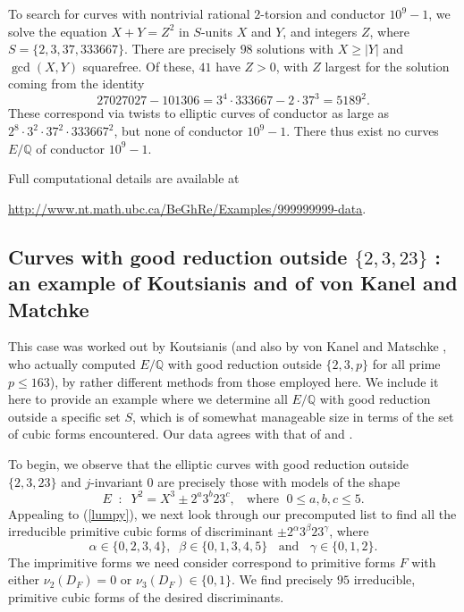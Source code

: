  To search for curves with nontrivial rational $2$-torsion and conductor $10^9-1$, we solve the equation $X+Y=Z^2$ in $S$-units $X$ and $Y$, and integers $Z$, where 
 $S=\{2,3, 37, 333667 \}$. There are precisely $98$ solutions with $X \geq |Y|$ and  $\gcd (X,Y)$ squarefree. Of these, $41$ have $Z > 0$, with $Z$ largest for the solution coming from  the identity
$$
27027027 -101306 = 3^4 \cdot 333667 -  2 \cdot 37^3 =  5189^2.
$$
These correspond via twists to elliptic curves of conductor as large as $2^8 \cdot 3^2 \cdot 37^2 \cdot 333667^2$, but none of conductor $10^9-1$. There thus exist no curves $E/\mathbb{Q}$  of conductor $10^9-1$.

Full computational details are available at
\begin{center}
\url{http://www.nt.math.ubc.ca/BeGhRe/Examples/999999999-data}.
\end{center}



\subsection{Curves with good reduction outside $\{ 2, 3, 23 \}$ : an example of Koutsianis and of von Kanel and Matchke}

This case was worked out by Koutsianis \cite{Kou} (and also by von Kanel and Matschke \cite{KanMat}, who actually computed $E/\mathbb{Q}$ with good reduction outside $\{ 2, 3, p \}$ for all prime $p \leq 163$), by rather different methods from those employed here. We include it here to provide an example where we determine all $E/\mathbb{Q}$ with good reduction outside a specific set $S$, which is of somewhat manageable size in terms of the set of cubic forms encountered. Our data agrees with that  of \cite{KanMat} and \cite{Kou}.

To begin, we observe that the elliptic curves with good reduction outside $\{ 2, 3, 23 \}$ and $j$-invariant $0$ are precisely those with models of the shape
$$
E \; \; : \; \; Y^2 = X^3 \pm 2^a 3^b 23^c, \; \; \mbox{ where } \; 0 \leq a, b, c \leq 5.
$$
Appealing to (\ref{lumpy}), we next  look through our precomputed list to find  all the irreducible primitive cubic forms of discriminant $\pm 2^{\alpha} 3^\beta 23^\gamma$,
where 
$$
\alpha \in \{ 0, 2, 3, 4 \}, \; \; \beta \in \{ 0, 1, 3, 4, 5 \} \; \; \mbox{ and } \; \; \gamma \in \{ 0, 1, 2 \}. 
$$
The imprimitive forms we need consider correspond to primitive
forms $F$ with either $\nu_2 (D_F) = 0$ or $\nu_3 (D_F) \in \{ 0, 1 \}$. We find precisely $95$ irreducible, primitive cubic forms of the desired discriminants.

